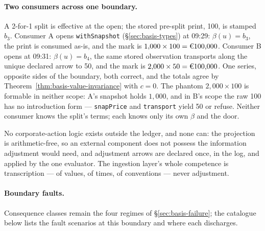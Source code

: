 \documentclass[11pt,a4paper]{article}
\newcommand{\EUR}[1]{\mbox{\texteuro#1}}
\begin{document}
\paragraph{Two consumers across one boundary.} A 2-for-1 split is effective at the
open; the stored pre-split print, 100, is stamped $b_3$. Consumer A opens
\texttt{withSnapshot} (\S\ref{sec:basis-types}) at 09:29: $\beta(u)=b_3$, the print
is consumed as-is, and the mark is $1{,}000\times100=\EUR{100{,}000}$. Consumer B
opens at 09:31: $\beta(u)=b_4$, the same stored observation transports along the
unique declared arrow to 50, and the mark is $2{,}000\times50=\EUR{100{,}000}$. One
series, opposite sides of the boundary, both correct, and the totals agree by
Theorem~\ref{thm:basis-value-invariance} with $c=0$. The phantom $2{,}000\times100$
is formable in neither scope: A's snapshot holds $1{,}000$, and in B's scope the raw
100 has no introduction form --- \texttt{snapPrice} and \texttt{transport} yield 50
or refuse. Neither consumer knows the split's terms; each knows only its own $\beta$
and the door.

No corporate-action logic exists outside the ledger, and none can: the projection is
arithmetic-free, so an external component does not possess the information
adjustment would need, and adjustment arrows are declared once, in the log, and
applied by the one evaluator. The ingestion layer's whole competence is
transcription --- of values, of times, of conventions --- never adjustment.

\paragraph{Boundary faults.} Consequence classes remain the four regimes of
\S\ref{sec:basis-failure}; the catalogue below lists the fault scenarios at this
boundary and where each discharges.
\end{document}

